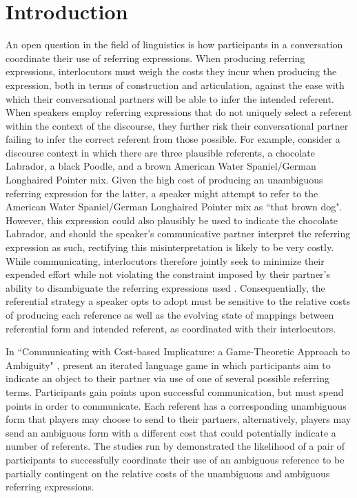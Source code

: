 \documentclass[12pt,a4paper]{article}
\begin{document}
\pagebreak


\tableofcontents

\pagebreak


\section{Introduction}
An open question in the field of linguistics is how participants in a conversation coordinate their use of referring expressions. When producing referring expressions, interlocutors must weigh the costs they incur when producing the expression, both in terms of construction and articulation, against the ease with which their conversational partners will be able to infer the intended referent. When speakers employ referring expressions that do not uniquely select a referent within the context of the discourse, they further risk their conversational partner failing to infer the correct referent from those possible. For example, consider a discourse context in which there are three plausible referents, a chocolate Labrador, a black Poodle, and a brown American Water Spaniel/German Longhaired Pointer mix. Given the high cost of producing an unambiguous referring expression for the latter, a speaker might attempt to refer to the American Water Spaniel/German Longhaired Pointer mix as ``that brown dog". However, this expression could also plausibly be used to indicate the chocolate Labrador, and should the speaker's communicative partner interpret the referring expression as such, rectifying this misinterpretation is likely to be very costly. While communicating, interlocutors therefore jointly seek to minimize their expended effort while not violating the constraint imposed by their partner's ability to disambiguate the referring expressions used \citep[p.~65-66]{benz2005}. Consequentially, the referential strategy a speaker opts to adopt must be sensitive to the relative costs of producing each reference as well as the evolving state of mappings between referential form and intended referent, as coordinated with their interlocutors. 

In ``Communicating with Cost-based Implicature: a Game-Theoretic Approach to Ambiguity" \citeyearpar{rohde2012}, \citeauthor{rohde2012} present an iterated language game in which participants aim to indicate an object to their partner via use of one of several possible referring terms. Participants gain points upon successful communication, but must spend points in order to communicate. Each referent has a corresponding unambiguous form that players may choose to send to
their partners, alternatively, players may send an ambiguous form with a different cost that could potentially indicate a number of referents. The studies run by \citeauthor{rohde2012} demonstrated the likelihood of a pair of participants to successfully coordinate their use of an ambiguous reference to be partially contingent on the relative costs of the unambiguous and ambiguous referring expressions.
\end{document}
